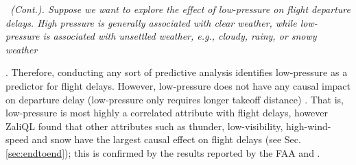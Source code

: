    \begin{example} \em \delay \ (Cont.).  \label{ex:press} \em Suppose
     we want to explore the effect of low-pressure on flight departure
     delays. High pressure is generally associated with clear weather,
     while low-pressure is associated with unsettled weather, e.g.,
     cloudy, rainy, or snowy
     weather. Therefore,
     conducting any sort of predictive analysis identifies
     low-pressure as a predictor for flight delays. However,
     low-pressure does not have any causal impact on departure delay
     (low-pressure only requires longer takeoff distance)
     \cite{FAA08}.  That is, low-pressure is most highly a correlated
     attribute with flight delays, however ZaliQL found that other
     attributes such as thunder, low-visibility, high-wind-speed and
     snow have the largest causal effect on flight delays (see
     Sec. \ref{sec:endtoend}); this is confirmed by the results
     reported by the FAA and \cite{weather}.

\end{example}







\vspace{-0.1cm}




